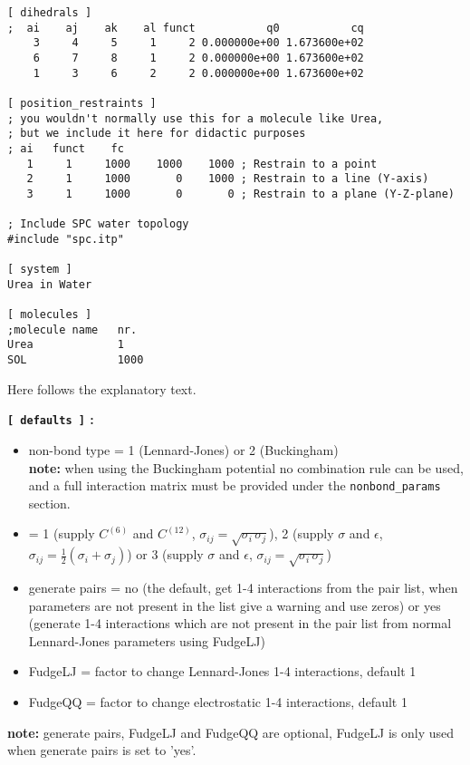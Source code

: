 {\begin{verbatim}
[ dihedrals ]
;  ai    aj    ak    al funct           q0           cq
    3     4     5     1     2 0.000000e+00 1.673600e+02 
    6     7     8     1     2 0.000000e+00 1.673600e+02 
    1     3     6     2     2 0.000000e+00 1.673600e+02 
 
[ position_restraints ]
; you wouldn't normally use this for a molecule like Urea,
; but we include it here for didactic purposes
; ai   funct    fc
   1     1     1000    1000    1000 ; Restrain to a point
   2     1     1000       0    1000 ; Restrain to a line (Y-axis)
   3     1     1000       0       0 ; Restrain to a plane (Y-Z-plane)

; Include SPC water topology
#include "spc.itp"

[ system ]
Urea in Water

[ molecules ]
;molecule name   nr.
Urea             1
SOL              1000
\end{verbatim}}

Here follows the explanatory text.

{\bf {\tt [~defaults~]} :}
\begin{itemize}
\item non-bond type = 1 (Lennard-Jones) or 2 (Buckingham)\\
{\bf note:} when using the Buckingham potential no combination rule can
be used, and a full interaction matrix must be provided under the 
{\tt nonbond\_params} section.
\item {} = 
1 (supply $C^{(6)}$ and $C^{(12)}$,
$\sigma_{ij}=\sqrt{\sigma_i\,\sigma_j}$),
2 (supply $\sigma$ and $\epsilon$,
$\sigma_{ij}=\frac{1}{2}(\sigma_i+\sigma_j)$) or
3 (supply $\sigma$ and $\epsilon$, $\sigma_{ij}=\sqrt{\sigma_i\,\sigma_j}$)
\item generate pairs = no
(the default, get 1-4 interactions from the pair list, when parameters
are not present in the list give a warning and use zeros)
or yes (generate 1-4 interactions which are not present in the pair list
from normal Lennard-Jones parameters using FudgeLJ)
\item FudgeLJ = factor to change Lennard-Jones 1-4 interactions, default 1
\item FudgeQQ = factor to change electrostatic 1-4 interactions, default 1
\end{itemize}
{\bf note:} generate pairs, FudgeLJ and FudgeQQ are optional,
FudgeLJ is only used when generate pairs is set to 'yes'.

%

